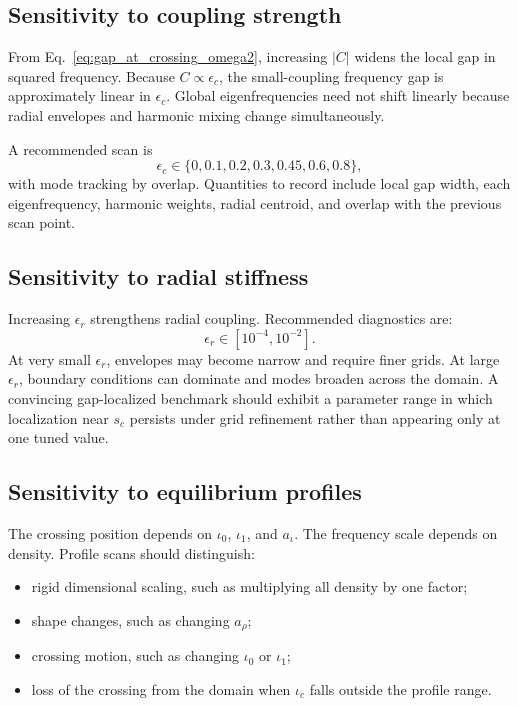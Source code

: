 \subsection{Sensitivity to coupling strength}
From Eq.~\eqref{eq:gap_at_crossing_omega2}, increasing $|C|$ widens the local gap in squared frequency. Because $C\propto\epsilon_c$, the small-coupling frequency gap is approximately linear in $\epsilon_c$. Global eigenfrequencies need not shift linearly because radial envelopes and harmonic mixing change simultaneously.

A recommended scan is
\begin{equation}
\epsilon_c\in\{0,0.1,0.2,0.3,0.45,0.6,0.8\},
\end{equation}
with mode tracking by overlap. Quantities to record include local gap width, each eigenfrequency, harmonic weights, radial centroid, and overlap with the previous scan point.

\subsection{Sensitivity to radial stiffness}
Increasing $\epsilon_r$ strengthens radial coupling. Recommended diagnostics are:
\begin{equation}
\epsilon_r\in[10^{-4},10^{-2}].
\end{equation}
At very small $\epsilon_r$, envelopes may become narrow and require finer grids. At large $\epsilon_r$, boundary conditions can dominate and modes broaden across the domain. A convincing gap-localized benchmark should exhibit a parameter range in which localization near $s_c$ persists under grid refinement rather than appearing only at one tuned value.

\subsection{Sensitivity to equilibrium profiles}
The crossing position depends on $\iota_0$, $\iota_1$, and $a_\iota$. The frequency scale depends on density. Profile scans should distinguish:
\begin{itemize}[leftmargin=1.6em]
\item rigid dimensional scaling, such as multiplying all density by one factor;
\item shape changes, such as changing $a_\rho$;
\item crossing motion, such as changing $\iota_0$ or $\iota_1$;
\item loss of the crossing from the domain when $\iota_c$ falls outside the profile range.
\end{itemize}

